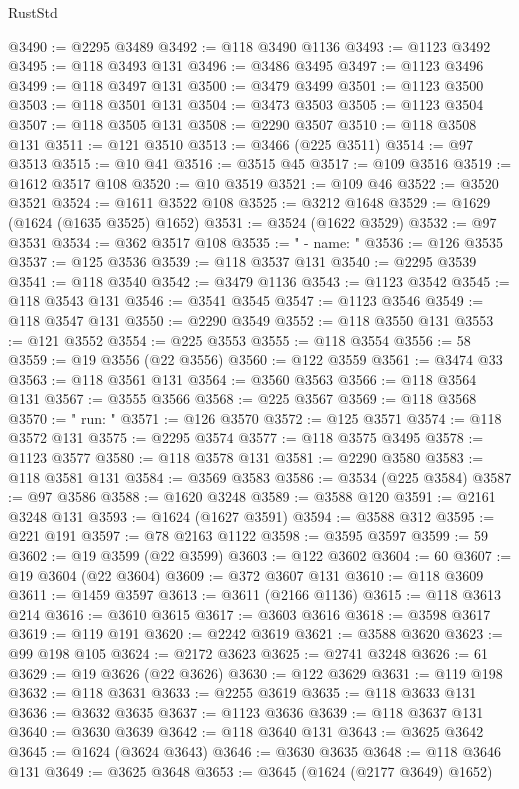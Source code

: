 \begin{lexlean}{RustStd}
\begin{coremodule}
@3490 := @2295 @3489
@3492 := @118 @3490 @1136
@3493 := @1123 @3492
@3495 := @118 @3493 @131
@3496 := @3486 @3495
@3497 := @1123 @3496
@3499 := @118 @3497 @131
@3500 := @3479 @3499
@3501 := @1123 @3500
@3503 := @118 @3501 @131
@3504 := @3473 @3503
@3505 := @1123 @3504
@3507 := @118 @3505 @131
@3508 := @2290 @3507
@3510 := @118 @3508 @131
@3511 := @121 @3510
@3513 := @3466 (@225 @3511)
@3514 := @97 @3513
@3515 := @10 @41
@3516 := @3515 @45
@3517 := @109 @3516
@3519 := @1612 @3517 @108
@3520 := @10 @3519
@3521 := @109 @46
@3522 := @3520 @3521
@3524 := @1611 @3522 @108
@3525 := @3212 @1648
@3529 := @1629 (@1624 (@1635 @3525) @1652)
@3531 := @3524 (@1622 @3529)
@3532 := @97 @3531
@3534 := @362 @3517 @108
@3535 := "      - name: "
@3536 := @126 @3535
@3537 := @125 @3536
@3539 := @118 @3537 @131
@3540 := @2295 @3539
@3541 := @118 @3540
@3542 := @3479 @1136
@3543 := @1123 @3542
@3545 := @118 @3543 @131
@3546 := @3541 @3545
@3547 := @1123 @3546
@3549 := @118 @3547 @131
@3550 := @2290 @3549
@3552 := @118 @3550 @131
@3553 := @121 @3552
@3554 := @225 @3553
@3555 := @118 @3554
@3556 := 58
@3559 := @19 @3556 (@22 @3556)
@3560 := @122 @3559
@3561 := @3474 @33
@3563 := @118 @3561 @131
@3564 := @3560 @3563
@3566 := @118 @3564 @131
@3567 := @3555 @3566
@3568 := @225 @3567
@3569 := @118 @3568
@3570 := "        run: "
@3571 := @126 @3570
@3572 := @125 @3571
@3574 := @118 @3572 @131
@3575 := @2295 @3574
@3577 := @118 @3575 @3495
@3578 := @1123 @3577
@3580 := @118 @3578 @131
@3581 := @2290 @3580
@3583 := @118 @3581 @131
@3584 := @3569 @3583
@3586 := @3534 (@225 @3584)
@3587 := @97 @3586
@3588 := @1620 @3248
@3589 := @3588 @120
@3591 := @2161 @3248 @131
@3593 := @1624 (@1627 @3591)
@3594 := @3588 @312
@3595 := @221 @191
@3597 := @78 @2163 @1122
@3598 := @3595 @3597
@3599 := 59
@3602 := @19 @3599 (@22 @3599)
@3603 := @122 @3602
@3604 := 60
@3607 := @19 @3604 (@22 @3604)
@3609 := @372 @3607 @131
@3610 := @118 @3609
@3611 := @1459 @3597
@3613 := @3611 (@2166 @1136)
@3615 := @118 @3613 @214
@3616 := @3610 @3615
@3617 := @3603 @3616
@3618 := @3598 @3617
@3619 := @119 @191
@3620 := @2242 @3619
@3621 := @3588 @3620
@3623 := @99 @198 @105
@3624 := @2172 @3623
@3625 := @2741 @3248
@3626 := 61
@3629 := @19 @3626 (@22 @3626)
@3630 := @122 @3629
@3631 := @119 @198
@3632 := @118 @3631
@3633 := @2255 @3619
@3635 := @118 @3633 @131
@3636 := @3632 @3635
@3637 := @1123 @3636
@3639 := @118 @3637 @131
@3640 := @3630 @3639
@3642 := @118 @3640 @131
@3643 := @3625 @3642
@3645 := @1624 (@3624 @3643)
@3646 := @3630 @3635
@3648 := @118 @3646 @131
@3649 := @3625 @3648
@3653 := @3645 (@1624 (@2177 @3649) @1652)

\end{coremodule}
\end{lexlean}

